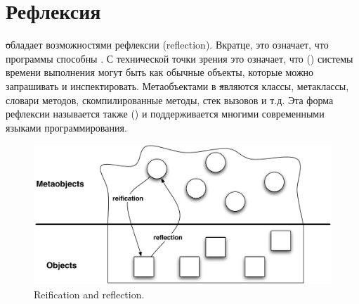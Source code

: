 \documentclass[a4paper,10pt,twoside]{book}
\begin{document}
	\sloppy
\fi

\chapter{Рефлексия}


\st обладает возможностями рефлексии (reflection).
Вкратце, это означает, что программы способны .
С технической точки зрения это означает, что  () системы времени выполнения могут быть  как обычные объекты, которые можно запрашивать и инспектировать.
Метаобъектами в \st являются классы, метаклассы, словари методов, скомпилированные методы, стек вызовов и т.д.
Эта форма рефлексии называется также  () и поддерживается многими современными языками программирования.


\begin{figure}[ht]\centering
	\includegraphics[width=\linewidth]{reflect}
	\caption{Reification and reflection.} %
\end{figure}
\end{document}
